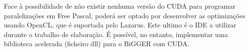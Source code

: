 Face à possibilidade de não existir nenhuma versão do CUDA para programar paralelizações em Free Pascal, poderá ser optado por desenvolver as optimizações usando OpenCL, que é suportada pelo Lazarus. Este ultimo é o IDE a utilizar durante o trabalho de elaboração. É possível, no entanto, implementar uma biblioteca acelerada (ficheiro dll) para o BiGGER com CUDA.


